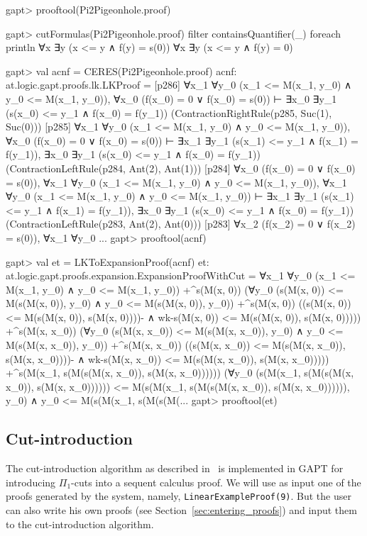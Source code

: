 \documentclass[a4paper,11pt]{article}
\begin{document}
\begin{clilisting}
gapt> prooftool(Pi2Pigeonhole.proof)

gapt> cutFormulas(Pi2Pigeonhole.proof) filter {containsQuantifier(_)} foreach println
∀x ∃y (x <= y ∧ f(y) = s(0))
∀x ∃y (x <= y ∧ f(y) = 0)

gapt> val acnf = CERES(Pi2Pigeonhole.proof)
acnf: at.logic.gapt.proofs.lk.LKProof =
[p286] ∀x_1 ∀y_0 (x_1 <= M(x_1, y_0) ∧ y_0 <= M(x_1, y_0)),
∀x_0 (f(x_0) = 0 ∨ f(x_0) = s(0))
⊢
∃x_0 ∃y_1 (s(x_0) <= y_1 ∧ f(x_0) = f(y_1))    (ContractionRightRule(p285, Suc(1), Suc(0)))
[p285] ∀x_1 ∀y_0 (x_1 <= M(x_1, y_0) ∧ y_0 <= M(x_1, y_0)),
∀x_0 (f(x_0) = 0 ∨ f(x_0) = s(0))
⊢
∃x_1 ∃y_1 (s(x_1) <= y_1 ∧ f(x_1) = f(y_1)),
∃x_0 ∃y_1 (s(x_0) <= y_1 ∧ f(x_0) = f(y_1))    (ContractionLeftRule(p284, Ant(2), Ant(1)))
[p284] ∀x_0 (f(x_0) = 0 ∨ f(x_0) = s(0)),
∀x_1 ∀y_0 (x_1 <= M(x_1, y_0) ∧ y_0 <= M(x_1, y_0)),
∀x_1 ∀y_0 (x_1 <= M(x_1, y_0) ∧ y_0 <= M(x_1, y_0))
⊢
∃x_1 ∃y_1 (s(x_1) <= y_1 ∧ f(x_1) = f(y_1)),
∃x_0 ∃y_1 (s(x_0) <= y_1 ∧ f(x_0) = f(y_1))    (ContractionLeftRule(p283, Ant(2), Ant(0)))
[p283] ∀x_2 (f(x_2) = 0 ∨ f(x_2) = s(0)),
∀x_1 ∀y_0 ...
gapt> prooftool(acnf)

gapt> val et = LKToExpansionProof(acnf)
et: at.logic.gapt.proofs.expansion.ExpansionProofWithCut =
∀x_1 ∀y_0 (x_1 <= M(x_1, y_0) ∧ y_0 <= M(x_1, y_0))
  +^{s(M(x, 0))}
    (∀y_0 (s(M(x, 0)) <= M(s(M(x, 0)), y_0) ∧ y_0 <= M(s(M(x, 0)), y_0))
      +^{s(M(x, 0))}
        ((s(M(x, 0)) <= M(s(M(x, 0)), s(M(x, 0))))- ∧
          wk-{s(M(x, 0)) <= M(s(M(x, 0)), s(M(x, 0)))}))
  +^{s(M(x, x_0))}
    (∀y_0 (s(M(x, x_0)) <= M(s(M(x, x_0)), y_0) ∧
          y_0 <= M(s(M(x, x_0)), y_0))
      +^{s(M(x, x_0))}
        ((s(M(x, x_0)) <= M(s(M(x, x_0)), s(M(x, x_0))))- ∧
          wk-{s(M(x, x_0)) <= M(s(M(x, x_0)), s(M(x, x_0)))}))
  +^{s(M(x_1, s(M(s(M(x, x_0)), s(M(x, x_0))))))}
    (∀y_0 (s(M(x_1, s(M(s(M(x, x_0)), s(M(x, x_0)))))) <=
            M(s(M(x_1, s(M(s(M(x, x_0)), s(M(x, x_0)))))), y_0) ∧
          y_0 <= M(s(M(x_1, s(M(s(M(...
gapt> prooftool(et)

\end{clilisting}

\subsection{Cut-introduction}\label{sec.cut-introduction}

The cut-introduction algorithm as described in~\cite{Hetzl2012,Hetzl14Algorithmic,Hetzl14Introducing} is
implemented in GAPT for introducing $\Pi_1$-cuts into a sequent calculus
proof. We will use as input one of the proofs generated by
the system, namely, \texttt{LinearExampleProof(9)}. But the user can also
write his own proofs (see Section~\ref{sec:entering_proofs})
and input them to the cut-introduction algorithm.
\end{document}
